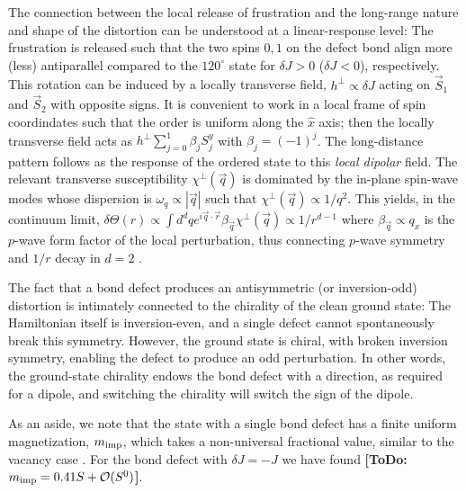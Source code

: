\documentclass[twocolumn,english,aps,showpacs,prl,floatfix]{revtex4-1}
\newcommand{\w}{\omega}
\newcommand{\mimp}{m_{\rm imp}}
\newcommand{\todo}[1]{{\color{red} {\bf [ToDo: #1]}}}
\begin{document}
The connection between the local release of frustration and the long-range nature and shape of the distortion can be understood at a linear-response level: The frustration is released such that the two spins $0,1$ on the defect bond align more (less) antiparallel compared to the $120^\circ$ state for $\delta J>0$ ($\delta J<0$), respectively. This rotation can be induced by a locally transverse field, $h^\perp \propto \delta J$ acting on $\vec{S}_1$ and $\vec{S}_2$ with opposite signs. It is convenient to work in a local frame of spin coordindates such that the order is uniform along the $\hat{x}$ axis; then the locally transverse field acts as $h^\perp \sum_{j=0}^1 \beta_j S_j^y$ with $\beta_j=(-1)^j$. The long-distance pattern follows as the response of the ordered state to this \emph{local dipolar} field.
%
The relevant transverse susceptibility $\chi^\perp(\vec{q})$ is dominated by the in-plane spin-wave modes whose dispersion is $\w_q\propto|\vec{q}|$ such that $\chi^\perp(\vec{q})\propto 1/q^2$. This yields, in the continuum limit, $\delta\Theta(r) \propto \int d^d q e^{i\vec{q}\cdot\vec{r}} \beta_{\vec{q}} \chi^\perp(\vec{q}) \propto 1/r^{d-1}$ where $\beta_{\vec{q}}\propto q_x$ is the $p$-wave form factor of the local perturbation, thus connecting $p$-wave symmetry and $1/r$ decay in $d=2$ \cite{suppl}.

The fact that a bond defect produces an antisymmetric (or inversion-odd) distortion is intimately connected to the chirality of the clean ground state: The Hamiltonian itself is inversion-even, and a single defect cannot spontaneously break this symmetry. However, the ground state is chiral, with broken inversion symmetry, enabling the defect to produce an odd perturbation. In other words, the ground-state chirality endows the bond defect with a direction, as required for a dipole, and switching the chirality will switch the sign of the dipole.

As an aside, we note that the state with a single bond defect has a finite uniform magnetization, $\mimp$, which takes a non-universal fractional value, similar to the vacancy case \cite{wollny11}. For the bond defect with $\delta J=-J$ we have found \todo{$\mimp = 0.41 S + \mathcal{O}(S^0)$}.

\end{document}
